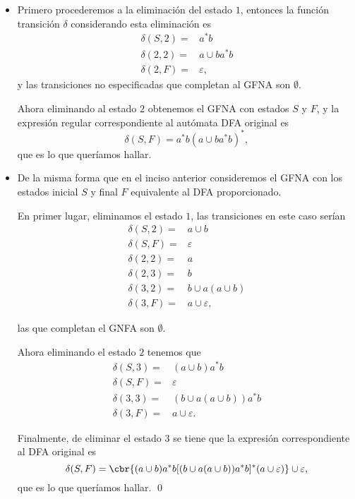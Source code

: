 \documentclass{article}
\begin{document}
\begin{itemize}
    \item [\colemph{a)}] Primero procederemos a la eliminación del estado $1$, entonces la función transición $\delta$ considerando esta eliminación es
    \[
        \begin{split}
            \delta(S,2)=&a^*b\\ 
            \delta(2,2)=&a\cup ba^*b\\ 
            \delta(2,F)=&\varepsilon,
        \end{split}
    \]
    y las transiciones no especificadas que completan al GFNA son $\emptyset$.

    Ahora eliminando al estado $2$ obtenemos el GFNA con estados $S$ y $F$, y la expresión regular correspondiente al autómata DFA original es 
    \[
        \delta(S,F)=a^*b(a\cup ba^*b)^*,  
    \]
        que es lo que queríamos hallar.

    \item [\colemph{b)}] De la misma forma que en el inciso anterior consideremos el GFNA con los estados inicial $S$ y final $F$ equivalente al DFA proporcionado. 
    
    En primer lugar, eliminamos el estado $1$, las transiciones en este caso serían 
    \begin{align*}
        \delta(S,2)=&a\cup b\\ 
        \delta(S,F)=&\varepsilon\\ 
        \delta(2,2)=& a\\ 
        \delta(2,3)=& b\\ 
        \delta(3,2)=& b\cup a(a\cup b)\\ 
        \delta(3,F)=&a\cup\varepsilon,
    \end{align*}

    las que completan el GNFA son $\emptyset$.

    Ahora eliminando el estado $2$ tenemos que 
    \begin{align*}
        \delta(S,3)=&(a\cup b)a^*b\\ 
        \delta(S,F)=&\varepsilon\\ 
        \delta(3,3)=&(b\cup a(a\cup b))a^*b\\ 
        \delta(3,F)=&a\cup\varepsilon.
    \end{align*}

    Finalmente, de eliminar el estado $3$ se tiene que la expresión correspondiente al DFA original es
    \[
        \delta(S,F)=\cbr{(a\cup b)a^*b[(b\cup a(a\cup b))a^*b]^*(a\cup \varepsilon)}\cup \varepsilon,
    \]
    que es lo que queríamos hallar. \qed
\end{itemize}
\end{document}
